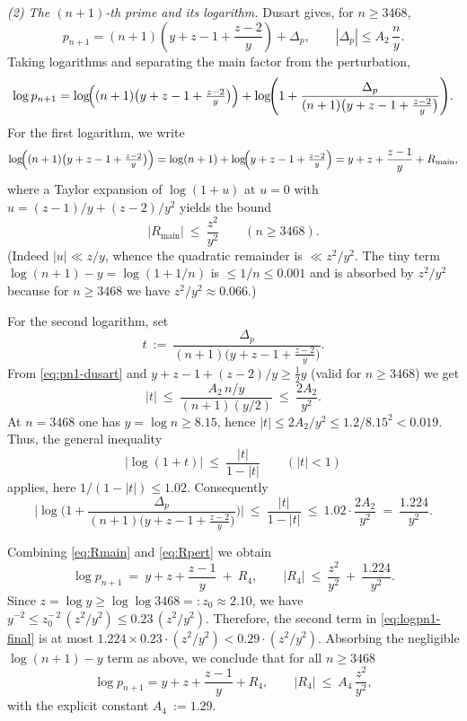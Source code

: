 \documentclass[10pt]{amsart}
\theoremstyle{definition} %
\numberwithin{equation}{section}
\begin{document}
\medskip

\emph{(2) The $(n\!+\!1)$-th prime and its logarithm.}
Dusart \cite[Prop.~5.16]{b1} gives, for $n\ge 3468$,
\begin{equation}\label{eq:pn1-dusart}
p_{n+1}=(n+1)\!\left(y+z-1+\frac{z-2}{y}\right)+\Delta_p,
\qquad
|\Delta_p|\le A_2\,\frac{n}{y}.
\end{equation}
Taking logarithms and separating the
main factor from the perturbation,
\[
\log p_{n+1}
= \log\!\Bigl((n+1)\bigl(y+z-1+\tfrac{z-2}{y}\bigr)\Bigr)
  + \log\!\Biggl(1+\frac{\Delta_p}{(n+1)\bigl(y+z-1+\tfrac{z-2}{y}\bigr)}\Biggr).
\]
For the first logarithm, we write
\[
\log\!\Bigl((n+1)\bigl(y+z-1+\tfrac{z-2}{y}\bigr)\Bigr)
= \log(n+1)+\log\!\Bigl(y+z-1+\tfrac{z-2}{y}\Bigr)
= y+z+\frac{z-1}{y}+R_{\mathrm{main}},
\]
where a Taylor expansion of $\log(1+u)$ at $u=0$ with
$u=(z-1)/y+(z-2)/y^2$ yields the bound
\begin{equation}\label{eq:Rmain}
|R_{\mathrm{main}}|\ \le\ \frac{z^2}{y^2}\qquad(n\ge 3468).
\end{equation}
(Indeed $|u|\ll z/y$, whence the quadratic remainder is $\ll z^2/y^2$. The tiny term
$\log(n+1)-y=\log(1+1/n)$ is $\le 1/n\le 0.001$ and is absorbed by $z^2/y^2$
because for $n\ge 3468$ we have $z^2/y^2\approx 0.066$.)

For the second logarithm, set
\[
t\ :=\ \frac{\Delta_p}{(n+1)\bigl(y+z-1+\tfrac{z-2}{y}\bigr)}.
\]
From \eqref{eq:pn1-dusart} and $y+z-1+(z-2)/y\ge\tfrac12 y$ (valid for $n\ge 3468$)
we get
\[
|t|\ \le\ \frac{A_2\,n/y}{(n+1)(y/2)}\ \le\ \frac{2A_2}{y^2}.
\]
At $n=3468$ one has $y=\log n\ge 8.15$, hence $|t|\le 2A_2/y^2\le 1.2/8.15^2<0.019$.
Thus, the general inequality
\[
|\log(1+t)|\ \le\ \frac{|t|}{1-|t|}\qquad(|t|<1)
\]
applies, here $1/(1-|t|)\le 1.02$. Consequently
\begin{equation}\label{eq:Rpert}
\Biggl|\log\!\Biggl(1+\frac{\Delta_p}{(n+1)\bigl(y+z-1+\tfrac{z-2}{y}\bigr)}\Biggr)\Biggr|
\ \le\ \frac{|t|}{1-|t|}
\ \le\ 1.02\cdot\frac{2A_2}{y^2}
\ =\ \frac{1.224}{y^2}.
\end{equation}

Combining \eqref{eq:Rmain} and \eqref{eq:Rpert} we obtain
\begin{equation}\label{eq:logpn1-final}
\log p_{n+1}\ =\ y+z+\frac{z-1}{y}\ +\ R_4,
\qquad
|R_4|\ \le\ \frac{z^2}{y^2}\ +\ \frac{1.224}{y^2}.
\end{equation}
Since $z=\log y\ge \log\log 3468=:z_0\approx 2.10$, we have
$y^{-2}\le z_0^{-\,2}\,(z^2/y^2)\le 0.23\,(z^2/y^2)$. Therefore, the second term
in \eqref{eq:logpn1-final} is at most $1.224\times 0.23\cdot(z^2/y^2)<0.29\cdot(z^2/y^2)$.
Absorbing the negligible $\log(n+1)-y$ term as above, we conclude that for all $n\ge 3468$
\begin{equation}\label{eq:logpn1}
\log p_{n+1}
= y+z+\frac{z-1}{y}+R_4,
\qquad
|R_4|\ \le\ A_4\,\frac{z^2}{y^2},
\end{equation}
with the explicit constant $A_4\ :=1.29$. 
\end{document}
